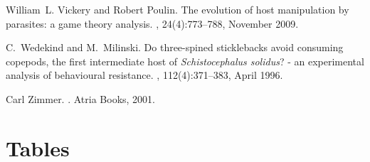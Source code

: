 \documentclass[11pt]{article}
\begin{document}
\begin{thebibliography}{10}
William~L. Vickery and Robert Poulin.
\newblock The evolution of host manipulation by parasites: a game theory
  analysis.
, 24(4):773--788, November 2009.

C.~Wedekind and M.~Milinski.
\newblock Do three-spined sticklebacks avoid consuming copepods, the first
  intermediate host of \textit{Schistocephalus solidus}? - an experimental
  analysis of behavioural resistance.
, 112(4):371--383, April 1996.

Carl Zimmer.
.
\newblock Atria Books, 2001.

\end{thebibliography}

\newpage{}

\section*{Tables}
\renewcommand{\thetable}{\arabic{table}}
\setcounter{table}{0}

\begin{table}[h]
\end{table}
%
\newpage{}
\end{document}
